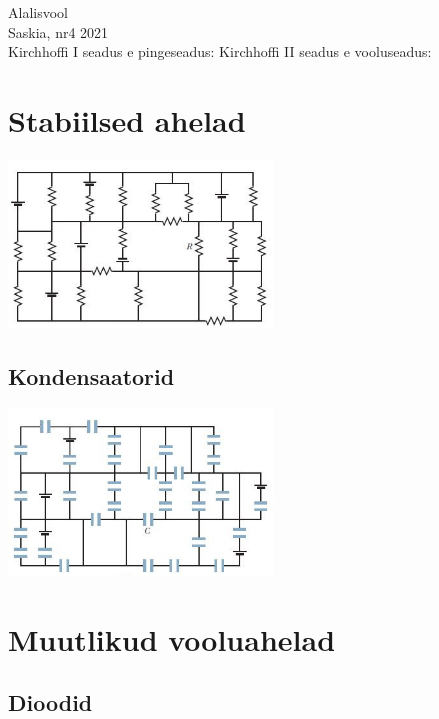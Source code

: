 \documentclass{article}
\begin{document}
\twocolumn
{\Huge Alalisvool}\\
{\Large Saskia, nr4 2021}\\
Kirchhoffi I seadus e pingeseadus:
Kirchhoffi II seadus e vooluseadus:
\section{Stabiilsed ahelad}
\begin{center}
\includegraphics[width =  7cm]{ec2.jpg}
\end{center}
\subsection{Kondensaatorid}
\begin{center}
\includegraphics[width =  7cm]{ec1.jpg}
\end{center}
\section{Muutlikud vooluahelad}
\subsection{Dioodid}
\end{document}
